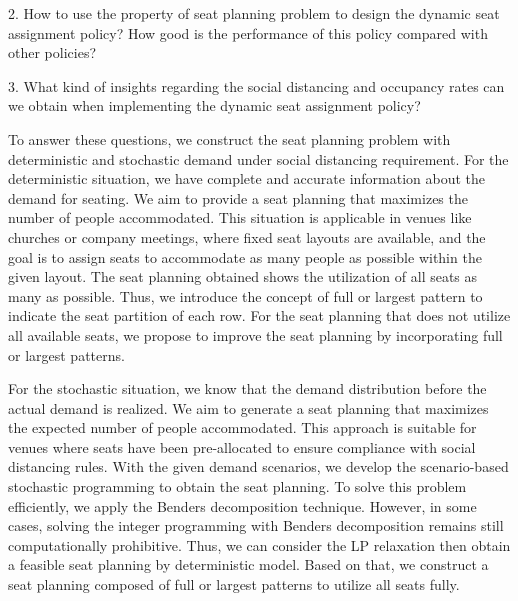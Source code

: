 2. How to use the property of seat planning problem to design the dynamic seat assignment policy? How good is the performance of this policy compared with other policies?

3. What kind of insights regarding the social distancing and occupancy rates can we obtain when implementing the dynamic seat assignment policy?


To answer these questions, we construct the seat planning problem with deterministic and stochastic demand under social distancing requirement. For the deterministic situation, we have complete and accurate information about the demand for seating. We aim to provide a seat planning that maximizes the number of people accommodated. This situation is applicable in venues like churches or company meetings, where fixed seat layouts are available, and the goal is to assign seats to accommodate as many people as possible within the given layout. The seat planning obtained shows the utilization of all seats as many as possible. Thus, we introduce the concept of full or largest pattern to indicate the seat partition of each row. For the seat planning that does not utilize all available seats, we propose to improve the seat planning by incorporating full or largest patterns.

For the stochastic situation, we know that the demand distribution before the actual demand is realized. We aim to generate a seat planning that maximizes the expected number of people accommodated. This approach is suitable for venues where seats have been pre-allocated to ensure compliance with social distancing rules. With the given demand scenarios, we develop the scenario-based stochastic programming to obtain the seat planning. To solve this problem efficiently, we apply the Benders decomposition technique. However, in some cases, solving the integer programming with Benders decomposition remains still computationally prohibitive. Thus, we can consider the LP relaxation then obtain a feasible seat planning by deterministic model. Based on that, we construct a seat planning composed of full or largest patterns to utilize all seats fully.

